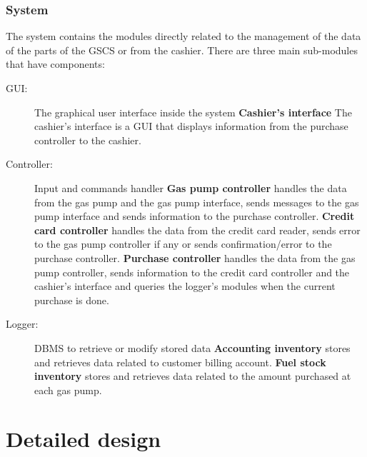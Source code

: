 \documentclass[a4paper, 11pt]{article}
\begin{document}
    \subsubsection{System}

    The system contains the modules directly related to the management of the
    data of the parts of the GSCS or from the cashier. There are three main
    sub-modules that have components:

    \begin{description}
        \item[GUI:] The graphical user interface inside the system
            \subitem\textbf{Cashier's interface} The cashier's interface is a
            GUI that displays information from the purchase controller to the
            cashier.
        \item[Controller:] Input and commands handler
            \subitem\textbf{Gas pump controller} handles the data from the gas
            pump and the gas pump interface, sends messages to the gas pump
            interface and sends information to the purchase controller.
            \subitem\textbf{Credit card controller} handles the data from the
            credit card reader, sends error to the gas pump controller if any
            or sends confirmation/error to the purchase controller.
            \subitem\textbf{Purchase controller} handles the data from the gas
            pump controller, sends information to the credit card controller
            and the cashier's interface and queries the logger's modules when
            the current purchase is done.
        \item[Logger:] DBMS to retrieve or modify stored data
            \subitem\textbf{Accounting inventory} stores and retrieves data
            related to customer billing account.
            \subitem\textbf{Fuel stock inventory} stores and retrieves data
            related to the amount purchased at each gas pump.
    \end{description}

    \section{Detailed design}
\end{document}
